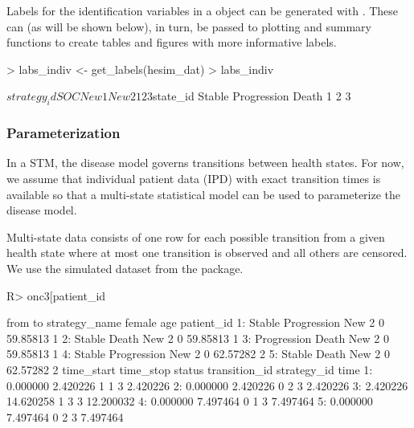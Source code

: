 \documentclass[article, nojss]{jss}\usepackage[]{graphicx}\usepackage[]{color}
\begin{document}
Labels for the identification variables in a  object can be generated with . These can (as will be shown below), in turn, be passed to plotting and summary functions to create tables and figures with more informative labels. 

\begin{Schunk}
\begin{Sinput}
> labs_indiv <- get_labels(hesim_dat)
> labs_indiv
\end{Sinput}
\begin{Soutput}
$strategy_id
  SOC New 1 New 2 
    1     2     3 

$state_id
     Stable Progression       Death 
          1           2           3 
\end{Soutput}
\end{Schunk}


\subsubsection{Parameterization}
In a STM, the disease model governs transitions between health states. For now, we assume that individual patient data (IPD) with exact transition times is available so that a multi-state statistical model can be used to parameterize the disease model. 

Multi-state data consists of one row for each possible transition from a given health state where at most one transition is observed and all others are censored. We use the simulated dataset  from the  package.

\begin{Schunk}
\begin{Sinput}
R> onc3[patient_id %
\end{Sinput}
\begin{Soutput}
          from          to strategy_name female      age patient_id
1:      Stable Progression         New 2      0 59.85813          1
2:      Stable       Death         New 2      0 59.85813          1
3: Progression       Death         New 2      0 59.85813          1
4:      Stable Progression         New 2      0 62.57282          2
5:      Stable       Death         New 2      0 62.57282          2
   time_start time_stop status transition_id strategy_id      time
1:   0.000000  2.420226      1             1           3  2.420226
2:   0.000000  2.420226      0             2           3  2.420226
3:   2.420226 14.620258      1             3           3 12.200032
4:   0.000000  7.497464      0             1           3  7.497464
5:   0.000000  7.497464      0             2           3  7.497464
\end{Soutput}
\end{Schunk}
\end{document}
